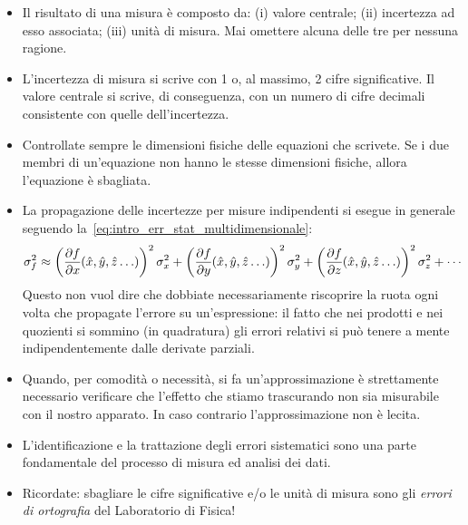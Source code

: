 \begin{itemize}
\item Il risultato di una misura è composto da: (i) valore centrale; (ii)
  incertezza ad esso associata; (iii) unità di misura. Mai omettere alcuna
  delle tre per nessuna ragione.
\item L'incertezza di misura si scrive con 1 o, al massimo, 2 cifre
  significative. Il valore centrale si scrive, di conseguenza, con un numero di
  cifre decimali consistente con quelle dell'incertezza.
\item Controllate sempre le dimensioni fisiche delle equazioni che scrivete.
  Se i due membri di un'equazione non hanno le stesse dimensioni fisiche, allora
  l'equazione è sbagliata.
\item La propagazione delle incertezze per misure indipendenti si esegue in
  generale seguendo la~\eqref{eq:intro_err_stat_multidimensionale}:
  \begin{align*}
    \sigma^2_f \approx
    \left(\pd{f}{x}{\hat{x}, \hat{y}, \hat{z}\ldots}\right)^2 \sigma^2_x +
    \left(\pd{f}{y}{\hat{x}, \hat{y}, \hat{z}\ldots}\right)^2 \sigma^2_y +
    \left(\pd{f}{z}{\hat{x}, \hat{y}, \hat{z}\ldots}\right)^2 \sigma^2_z + \cdots
  \end{align*}
  Questo non vuol dire che dobbiate necessariamente riscoprire la ruota ogni
  volta che propagate l'errore su un'espressione: il fatto che nei prodotti e
  nei quozienti si sommino (in quadratura) gli errori relativi si può
  tenere a mente indipendentemente dalle derivate parziali.
\item Quando, per comodità o necessità, si fa un'approssimazione è
  strettamente necessario verificare che l'effetto che stiamo trascurando
  non sia misurabile con il nostro apparato. In caso contrario l'approssimazione
  non è lecita.
\item L'identificazione e la trattazione degli errori sistematici sono una
  parte fondamentale del processo di misura ed analisi dei dati.
\item Ricordate: sbagliare le cifre significative e/o le unità di misura sono
  gli \emph{errori di ortografia} del Laboratorio di Fisica!
\end{itemize}
